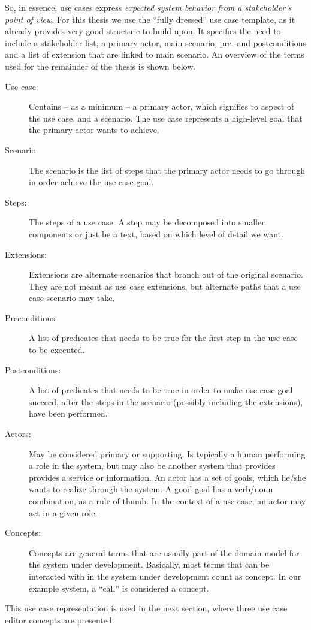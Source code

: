 \noindent So, in essence, use cases express \emph{expected system behavior from a stakeholder's point of view}. For this thesis we use the ``fully dressed'' use case template\cite{larman2005}, as it already provides very good structure to build upon. It specifies the need to include a stakeholder list, a primary actor, main scenario, pre- and postconditions and a list of extension that are linked to main scenario. An overview of the terms used for the remainder of the thesis is shown below.
\begin{description}

  \item[Use case:] Contains -- as a minimum -- a primary actor, which signifies to aspect of the use case, and a scenario. The use case represents a high-level goal that the primary actor wants to achieve.

  \item[Scenario:] The scenario is the list of steps that the primary actor needs to go through in order achieve the use case goal.

  \item[Steps:] The steps of a use case. A step may be decomposed into smaller components or just be a text, based on which level of detail we want. 

  \item[Extensions:] Extensions are alternate scenarios that branch out of the original scenario. They are not meant as use case extensions, but alternate paths that a use case scenario may take.

  \item[Preconditions:] A list of predicates that needs to be true for the first step in the use case to be executed.

  \item[Postconditions:] A list of predicates that needs to be true in order to make use case goal succeed, after the steps in the scenario (possibly including the extensions), have been performed.

  \item[Actors:] May be considered primary or supporting. Is typically a human performing a role in the system, but may also be another system that provides provides a service or information. An actor has a set of goals, which he/she wants to realize through the system. A good goal has a verb/noun combination, as a rule of thumb. In the context of a use case, an actor may act in a given role.

  \item[Concepts:] Concepts are general terms that are usually part of the domain model for the system under development. Basically, most terms that can be interacted with in the system under development count as concept. In our example system, a ``call'' is considered a concept.
  
\end{description}
This use case representation is used in the next section, where three use case editor concepts are presented.




